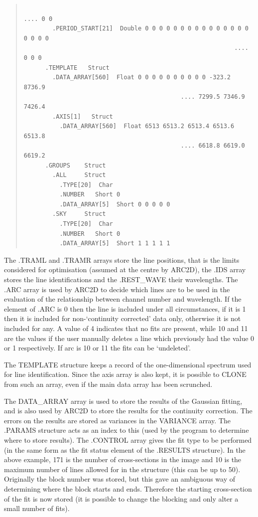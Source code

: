 \documentclass[11pt,twoside]{article}
\begin{document}
\begin{quote}
\begin{verbatim}
                                                             .... 0 0
        .PERIOD_START[21]  Double 0 0 0 0 0 0 0 0 0 0 0 0 0 0 0 0 0 0 0
                                                           .... 0 0 0
      .TEMPLATE   Struct
        .DATA_ARRAY[560]  Float 0 0 0 0 0 0 0 0 0 0 -323.2 8736.9
                                            .... 7299.5 7346.9 7426.4
        .AXIS[1]   Struct
          .DATA_ARRAY[560]  Float 6513 6513.2 6513.4 6513.6 6513.8
                                            .... 6618.8 6619.0 6619.2
      .GROUPS    Struct
        .ALL     Struct
          .TYPE[20]  Char
          .NUMBER   Short 0
          .DATA_ARRAY[5]  Short 0 0 0 0 0
        .SKY     Struct
          .TYPE[20]  Char
          .NUMBER   Short 0
          .DATA_ARRAY[5]  Short 1 1 1 1 1
 \end{verbatim}\end{quote}

The .TRAML and .TRAMR arrays store the line positions, that is the limits
considered for optimisation (assumed at the centre by ARC2D), the .IDS
array stores the line identifications and the .REST\_WAVE their wavelengths.
The .ARC array is used by ARC2D to decide which lines are to be used in the
evaluation of the relationship between channel number and wavelength.  If
the element of .ARC is 0 then the line is included under all circumstances,
if it is 1 then it is included for non-`continuity corrected' data only,
otherwise it is not included for any.  A value of 4 indicates that no fits
are present, while 10 and 11 are the values if the user manually deletes a
line which previously had the value 0 or 1 respectively.  If arc is 10 or
11 the fits can be `undeleted'.

The TEMPLATE structure keeps a record of the one-dimensional spectrum
used for line identification.
Since the axis array is also kept, it is possible to CLONE from such an
array, even if the main data array has been scrunched.

The DATA\_ARRAY array is used to store the results of the Gaussian fitting,
and is also used by ARC2D to store the results for the continuity
correction. The errors on the results are stored as variances in the
VARIANCE array. The .PARAMS structure acts as an index to this (used by
the program to determine where to store results).
The .CONTROL array gives the fit type to be performed (in the same form
as the fit status element of the .RESULTS structure).
In the
above example, 171 is the number of cross-sections in the image and 10
is the maximum number of lines allowed for in the structure (this can
be up to 50). Originally the block number was stored, but this gave an
ambiguous way of determining where the block starts and ends. Therefore
the starting cross-section of the fit is now stored (it is possible to
change the blocking and only alter a small number of fits).
\end{document}

